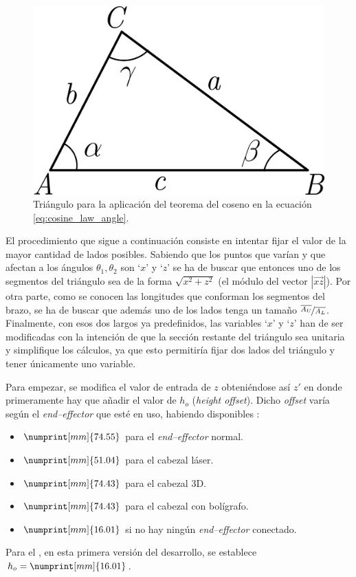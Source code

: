 \begin{figure}[H]
    \centering
    \includegraphics[width=.3\linewidth]{pictures/cosine_law.png}
    \caption{Triángulo para la aplicación del teorema del coseno en la ecuación \ref{eq:cosine_law_angle}.}
    \label{fig:cosine_law_triangle}
\end{figure}

El procedimiento que sigue a continuación consiste en intentar fijar el valor de la mayor
cantidad de lados posibles. Sabiendo que los puntos que varían y que afectan a los ángulos
$\theta_1, \theta_2$ son `$x$' y `$z$' se ha de buscar que entonces uno de los segmentos
del triángulo sea de la forma $\sqrt{x^2 + z^2}$ (el módulo del vector $\left|{\overrightarrow{xz}}\right|$).
Por otra parte, como se conocen las longitudes que conforman los segmentos del brazo, se
ha de buscar que además uno de los lados tenga un tamaño $\nicefrac{\overline{A_U}}{\overline{A_L}}$.
Finalmente, con esos dos largos ya predefinidos, las variables `$x$' y `$z$' han de ser
modificadas con la intención de que la sección restante del triángulo sea unitaria y
simplifique los cálculos, ya que esto permitiría fijar dos lados del triángulo y tener únicamente
uno variable.

Para empezar, se modifica el valor de entrada de $z$ obteniéndose así $z'$ en donde
primeramente hay que añadir el valor de $h_o$ (\textit{height offset}). Dicho \textit{offset}
varía según el \textit{end--effector} que esté en uso, habiendo disponibles \cite{UArmDeveloperSwiftProForArduino}:

\begin{itemize}
    \item $\numprint[mm]{74.55}$ para el \textit{end--effector} normal.
    \item $\numprint[mm]{51.04}$ para el cabezal láser.
    \item $\numprint[mm]{74.43}$ para el cabezal 3D.
    \item $\numprint[mm]{74.43}$ para el cabezal con bolígrafo.
    \item $\numprint[mm]{16.01}$ si no hay ningún \textit{end--effector} conectado.
\end{itemize}

Para el \pArm{}, en esta primera versión del desarrollo, se establece $h_o = \numprint[mm]{16.01}$.

